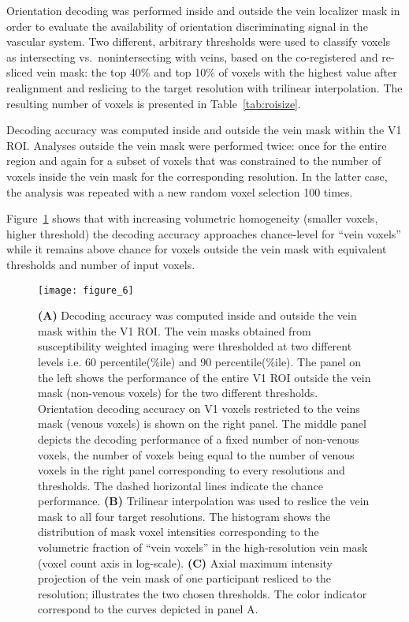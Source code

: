 \noindent Orientation decoding was performed inside and outside the vein
localizer mask in order to evaluate the availability of orientation
discriminating signal in the vascular system. Two different, arbitrary
thresholds were used to classify voxels as intersecting vs.~nonintersecting
with veins, based on the co-registered and re-sliced vein mask: the top 40\%
and top 10\% of voxels with the highest value after realignment and
reslicing to the target resolution with trilinear interpolation. The resulting
number of voxels is presented in Table~\ref{tab:roisize}.

Decoding accuracy was computed inside and outside the vein mask within the V1
ROI. Analyses outside the vein mask were performed twice: once for the entire
region and again for a subset of voxels that was constrained to the number
of voxels inside the vein mask for the corresponding resolution. In the latter
case, the analysis was repeated with a new random voxel selection 100 times.

Figure~\ref{fig:venous_voxels} shows that with increasing volumetric
homogeneity (smaller voxels, higher threshold) the decoding accuracy approaches
chance-level for ``vein voxels'' while it remains above chance for voxels
outside the vein mask with equivalent thresholds and number of input voxels.



\begin{figure}
  \centering
  \texttt{[image: figure\_6]}
  \caption{%
    \textbf{(A)} Decoding accuracy was computed inside and outside the vein mask within the V1
    ROI. The vein masks obtained from susceptibility weighted imaging were thresholded
    at two different levels i.e. 60 percentile(\%ile) and 90 percentile(\%ile).
    The panel on the left shows the performance of the entire V1 ROI outside the vein mask (non-venous voxels) 
    for the two different thresholds. Orientation decoding accuracy on V1 voxels restricted to the 
    veins mask (venous voxels) is shown on the right panel. The middle panel 
    depicts the decoding performance of a fixed number of non-venous voxels, 
    the number of voxels being equal to the number of venous voxels in the right panel 
    corresponding to every resolutions and thresholds. The dashed horizontal lines indicate the chance performance.
    \textbf{(B)} Trilinear interpolation was used to reslice the vein mask to all
    four target resolutions. The histogram shows the distribution of mask voxel
    intensities corresponding to the volumetric fraction of ``vein voxels'' in
    the high-resolution vein mask (voxel count axis in log-scale).
    \textbf{(C)} Axial maximum intensity projection of the vein mask of one participant
    resliced to the  resolution; illustrates the two chosen thresholds. The color indicator correspond to the curves depicted in panel A.
    }
    \label{fig:venous_voxels}
\end{figure}


